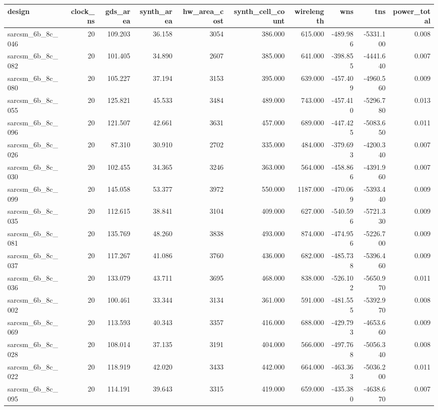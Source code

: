 \begin{tabular}{lrrrrrrrrr}
\toprule
design & clock\_ns & gds\_area & synth\_area & hw\_area\_cost & synth\_cell\_count & wirelength & wns & tns & power\_total \\
\midrule
sarcsm\_6b\_8c\_046 & 20 & 109.203 & 36.158 & 3054 & 386.000 & 615.000 & -489.986 & -5331.100 & 0.008 \\
sarcsm\_6b\_8c\_082 & 20 & 101.405 & 34.890 & 2607 & 385.000 & 641.000 & -398.855 & -4441.640 & 0.007 \\
sarcsm\_6b\_8c\_080 & 20 & 105.227 & 37.194 & 3153 & 395.000 & 639.000 & -457.409 & -4960.560 & 0.009 \\
sarcsm\_6b\_8c\_055 & 20 & 125.821 & 45.533 & 3484 & 489.000 & 743.000 & -457.410 & -5296.780 & 0.013 \\
sarcsm\_6b\_8c\_096 & 20 & 121.507 & 42.661 & 3631 & 457.000 & 689.000 & -447.425 & -5083.650 & 0.011 \\
sarcsm\_6b\_8c\_026 & 20 & 87.310 & 30.910 & 2702 & 335.000 & 484.000 & -379.693 & -4200.340 & 0.007 \\
sarcsm\_6b\_8c\_030 & 20 & 102.455 & 34.365 & 3246 & 363.000 & 564.000 & -458.866 & -4391.960 & 0.007 \\
sarcsm\_6b\_8c\_099 & 20 & 145.058 & 53.377 & 3972 & 550.000 & 1187.000 & -470.069 & -5393.440 & 0.009 \\
sarcsm\_6b\_8c\_035 & 20 & 112.615 & 38.841 & 3104 & 409.000 & 627.000 & -540.596 & -5721.330 & 0.009 \\
sarcsm\_6b\_8c\_081 & 20 & 135.769 & 48.260 & 3838 & 493.000 & 874.000 & -474.956 & -5226.700 & 0.009 \\
sarcsm\_6b\_8c\_037 & 20 & 117.267 & 41.086 & 3760 & 436.000 & 682.000 & -485.738 & -5396.460 & 0.009 \\
sarcsm\_6b\_8c\_036 & 20 & 133.079 & 43.711 & 3695 & 468.000 & 838.000 & -526.102 & -5650.970 & 0.011 \\
sarcsm\_6b\_8c\_002 & 20 & 100.461 & 33.344 & 3134 & 361.000 & 591.000 & -481.555 & -5392.970 & 0.008 \\
sarcsm\_6b\_8c\_069 & 20 & 113.593 & 40.343 & 3357 & 416.000 & 688.000 & -429.793 & -4653.660 & 0.009 \\
sarcsm\_6b\_8c\_028 & 20 & 108.014 & 37.135 & 3191 & 404.000 & 566.000 & -497.768 & -5056.340 & 0.008 \\
sarcsm\_6b\_8c\_022 & 20 & 118.919 & 42.020 & 3433 & 442.000 & 664.000 & -463.363 & -5036.200 & 0.011 \\
sarcsm\_6b\_8c\_095 & 20 & 114.191 & 39.643 & 3315 & 419.000 & 659.000 & -435.380 & -4638.670 & 0.007 \\

\end{tabular}
